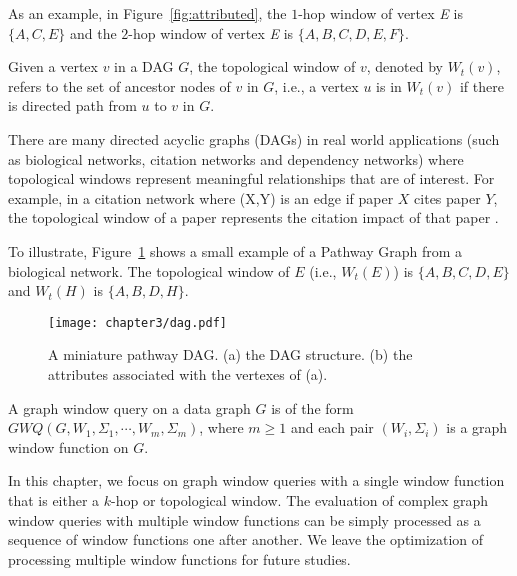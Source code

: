 As an example, in Figure~\ref{fig:attributed}, the $1$-hop window of vertex \emph{E} is $\{A,C,E\}$ and the $2$-hop window of vertex \emph{E} is $\{A,B,C,D,E,F\}$.  

\begin{definition} 
Given a vertex $v$ in a DAG $G$, the topological window of $v$, denoted by $W_t(v)$,
refers to the set of ancestor nodes of $v$ in $G$,
i.e., a vertex $u$ is in $W_t(v)$ if there is directed path from $u$ to $v$ in $G$.
\end{definition}

There are many directed acyclic graphs (DAGs) in real world applications (such as biological networks, citation networks and dependency networks)
where topological windows represent meaningful relationships that are of interest.
For example, in a citation network where (X,Y) is an edge if paper $X$ cites paper $Y$, 
the topological window of a paper represents the citation impact of that paper \cite{campanario2011empirical,holsapple2003citation,ma2008bringing}.

To illustrate, Figure~\ref{fig:topological} shows a small example of a Pathway Graph from a biological network. 
The topological window of $E$ (i.e., $W_t(E)$) is $\{A, B, C, D, E\}$ and $W_t(H)$ is $\{A, B, D, H\}$.


\begin{figure}[h]
\centering
 \texttt{[image: chapter3/dag.pdf]}
	\caption{A miniature pathway DAG. (a) the DAG structure. (b) the attributes associated with the vertexes of (a).}
	\label{fig:topological}
\end{figure}

\begin{definition} 
A graph window query on a data graph $G$ is of the form
$GWQ(G, W_1, \Sigma_1,\cdots, W_m, \Sigma_m)$, where $m \geq 1$
and
each pair $(W_i,\Sigma_i)$ is a graph window function on $G$.
\end{definition}
In this chapter, we focus on graph window queries with a single window 
function that is either a $k$-hop or topological window. 
The evaluation of complex graph window queries with multiple window 
functions can be simply processed as a sequence of window functions one
after another. 
We leave the optimization of processing multiple window functions for future studies.

